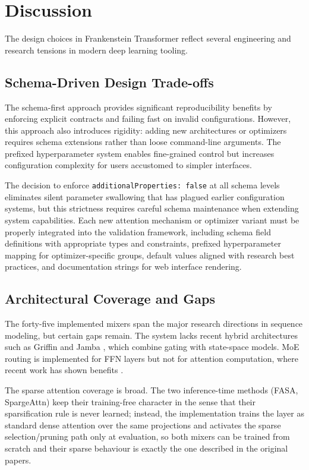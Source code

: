 \section{Discussion}
\label{sec:discussion}

The design choices in Frankenstein Transformer reflect several engineering and research tensions in modern deep learning tooling.

\subsection{Schema-Driven Design Trade-offs}

The schema-first approach provides significant reproducibility benefits by enforcing explicit contracts and failing fast on invalid configurations. However, this approach also introduces rigidity: adding new architectures or optimizers requires schema extensions rather than loose command-line arguments. The prefixed hyperparameter system enables fine-grained control but increases configuration complexity for users accustomed to simpler interfaces.

The decision to enforce \texttt{additionalProperties: false} at all schema levels eliminates silent parameter swallowing that has plagued earlier configuration systems, but this strictness requires careful schema maintenance when extending system capabilities. Each new attention mechanism or optimizer variant must be properly integrated into the validation framework, including schema field definitions with appropriate types and constraints, prefixed hyperparameter mapping for optimizer-specific groups, default values aligned with research best practices, and documentation strings for web interface rendering.

\subsection{Architectural Coverage and Gaps}

The forty-five implemented mixers span the major research directions in sequence modeling, but certain gaps remain. The system lacks recent hybrid architectures such as Griffin \citep{soares_griffin_2024} and Jamba \citep{gu_jamba_2024}, which combine gating with state-space models. MoE routing is implemented for FFN layers but not for attention computation, where recent work has shown benefits \citep{lewis_moe_2021}.

The sparse attention coverage is broad. The two inference-time methods (FASA, SpargeAttn) keep their training-free character in the sense that their sparsification rule is never learned; instead, the implementation trains the layer as standard dense attention over the same projections and activates the sparse selection/pruning path only at evaluation, so both mixers can be trained from scratch and their sparse behaviour is exactly the one described in the original papers.


